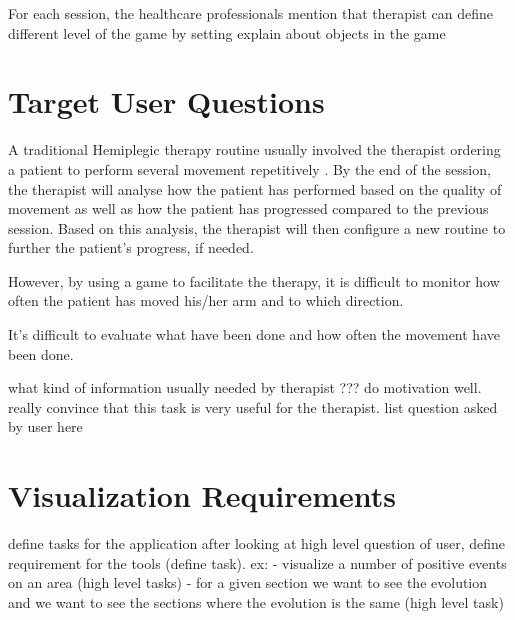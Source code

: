 
For each session, the healthcare professionals mention that therapist can define different level of the game by setting
explain about objects in the game

\section{Target User Questions}

A traditional Hemiplegic therapy routine usually involved the therapist ordering a patient to perform several movement repetitively \cite{rahman}. By the end of the session, the therapist will analyse how the patient has performed based on the quality of movement as well as how the patient has progressed compared to the previous session. Based on this analysis, the therapist will then configure a new routine to further the patient's progress, if needed.

However, by using a game to facilitate the therapy, it is difficult to monitor how often the patient has moved his/her arm and to which direction. 


It's difficult to evaluate what have been done and how often the movement have been done.

what kind of information usually needed by therapist ???
do motivation well. really convince that this task is very useful for the therapist.
list question asked by user here

\section{Visualization Requirements}
define tasks for the application
after looking at high level question of user, define requirement for the tools (define task).
ex: - visualize a number of positive events on an area (high level tasks)
		- for a given section we want to see the evolution and we want to see the sections where the evolution is the same (high level task)